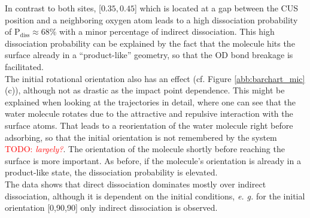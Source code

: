 \documentclass[11pt,DIV=13,BCOR=5mm,a4paper,headinclude]{scrbook}
\newcommand\todo[1]{\textcolor{red}{TODO: \textit{{#1}}}}
\begin{document}
In contrast to both sites, [$0.35,0.45$] which is located at a gap between the CUS position and a neighboring oxygen atom leads to a high dissociation probability of P$_\textrm{diss}\approx 68\%$ with a minor percentage of indirect dissociation.
This high dissociation probability can be explained by the fact that the molecule hits the surface already in a ``product-like'' geometry, so that the OD bond breakage is facilitated.
\\
The initial rotational orientation also has an effect (cf.
Figure \ref{abb:barchart_mic}(c)), although not as drastic as the impact point dependence.
This might be explained when looking at the trajectories in detail, where one can see that the water molecule rotates due to the attractive and repulsive interaction with the surface atoms.
That leads to a reorientation of the water molecule right before adsorbing, so that the initial orientation is not remembered by the system \todo{largely?}.
The orientation of the molecule shortly before reaching the surface is more important.
As before, if the molecule's orientation is already in a product-like state, the dissociation probability is elevated.
\\
The data shows that direct dissociation dominates mostly over indirect dissociation, although it is dependent on the initial conditions, \textit{e.
g.} for the initial orientation [0,90,90] only indirect dissociation is observed.

 
\end{document}
